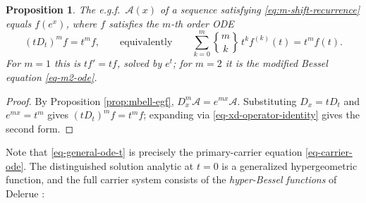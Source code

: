 \documentclass[a4paper]{amsart}
\numberwithin{equation}{section}
\newcommand{\Stirling}[0]{\genfrac\{\}{0pt}{}}
\newtheorem{proposition}[theorem]{Proposition}
\begin{document}
\begin{proposition}\label{prop-general-ode}
The e.g.f.\ $\mathcal{A}(x)$ of a sequence satisfying \eqref{eq:m-shift-recurrence} equals $f(e^x)$, where $f$ satisfies the $m$-th order ODE
\begin{equation}\label{eq-general-ode-t}
(tD_t)^m f = t^m f, \qquad \text{equivalently} \qquad \sum_{k=0}^m\Stirling{m}{k}\,t^k f^{(k)}(t) = t^m f(t).
\end{equation}
For $m=1$ this is $tf' = tf$, solved by $e^t$; for $m=2$ it is the modified Bessel equation \eqref{eq-m2-ode}.
\end{proposition}
\begin{proof}
By Proposition \ref{prop:mbell-egf}, $D_x^m \mathcal{A} = e^{mx}\mathcal{A}$. Substituting $D_x = tD_t$ and $e^{mx} = t^m$ gives $(tD_t)^m f = t^m f$; expanding via \eqref{eq-xd-operator-identity} gives the second form.
\end{proof}

Note that \eqref{eq-general-ode-t} is precisely the primary-carrier equation \eqref{eq-carrier-ode}. The distinguished solution analytic at $t = 0$ is a generalized hypergeometric function, and the full carrier system consists of the \emph{hyper-Bessel functions} of Delerue \cite{delerue1953, kiryakova1994}:
\end{document}
